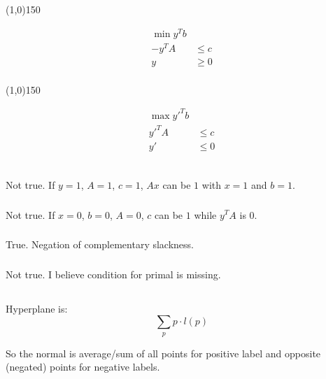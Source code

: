 \documentclass[a4paper,11pt,oneside,onecolumn]{article}
\def\zline{
    \vspace{-2.9em}
    \begin{center}\centering\line(1,0){150}\end{center}
    \vspace{-2.9em}
}
\begin{document}
\zline

\begin{align*}
\min y^Tb & \\
-y^TA & \le c \\
y & \ge 0 \\
\end{align*}

\zline

\begin{align*}
\max y'^Tb & \\
y'^TA & \le c \\
y' & \le 0 \\
\end{align*}

\subsection{}

\subsubsection{}

Not true. If $y = 1$, $A = 1$, $c = 1$, $Ax$ can be $1$ with $x = 1$ and $b = 1$.

\subsubsection{}

Not true. If $x = 0$, $b = 0$, $A = 0$, $c$ can be $1$ while $y^TA$ is $0$.

\subsubsection{}

True. Negation of complementary slackness.

\subsubsection{}

Not true. I believe condition for primal is missing.

\subsection{}

Hyperplane is:
$$
\sum_p p \cdot l(p)
$$

So the normal is average/sum of all points for positive label and opposite (negated) points for negative labels.

\section{}

\section{}

\section{}

\section{}
\end{document}
